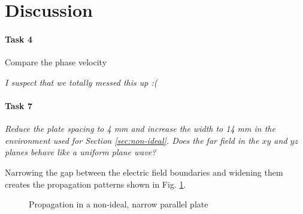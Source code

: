 \section{Discussion}\label{sec:discussion}
\paragraph{Task 4} Compare the phase velocity 

\textit{I suspect that we totally messed this up :(}

\paragraph{Task 7} \textit{Reduce the plate spacing to 4 mm and increase the width to 14 mm in the environment used for Section \ref{sec:non-ideal}.
Does the far field in the $xy$ and $yz$ planes behave like a uniform plane wave?}

Narrowing the gap between the electric field boundaries and widening them creates the propagation patterns shown in Fig. \ref{fig:narrow}.

\begin{figure}[htpb]
	\centering
	\caption{Propagation in a non-ideal, narrow parallel plate}
	\label{fig:narrow}
\end{figure}


